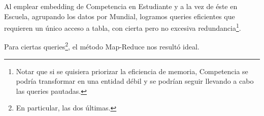 \par Al emplear embedding de Competencia en Estudiante y a la vez de éste en Escuela, agrupando los datos 
por Mundial, logramos queries eficientes que requieren un único acceso a tabla, con cierta pero no excesiva 
redundancia\footnote{Notar que si se quisiera priorizar la eficiencia de memoria, 
Competencia se podría transformar en una entidad débil y se podrían seguir llevando
a cabo las queries pautadas.}.

\par Para ciertas queries\footnote{En particular, las dos últimas.}, el método Map-Reduce nos resultó ideal.
